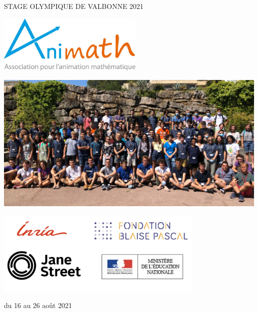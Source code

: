 
\begin{center}\LARGE{\textsc{STAGE OLYMPIQUE DE VALBONNE 2021}}
\vrule depth 0pt height 0.4pt width 16cm\end{center}

\vspace{1cm}

\begin{center}
\center\includegraphics[width=7cm]{01-Intro/logos/animath.jpg}
\end{center}

\vspace{2cm}

\begin{center}
\includegraphics[width=\linewidth]{02-Trombi/groupe.jpg}
\end{center}

\vspace{2cm}

\begin{center}
\center\includegraphics[width=10cm]{01-Intro/logos/tous.png}
\end{center}

\vfill

\begin{center}\Large{du 16 au 26 août 2021}\end{center}

\restoregeometry